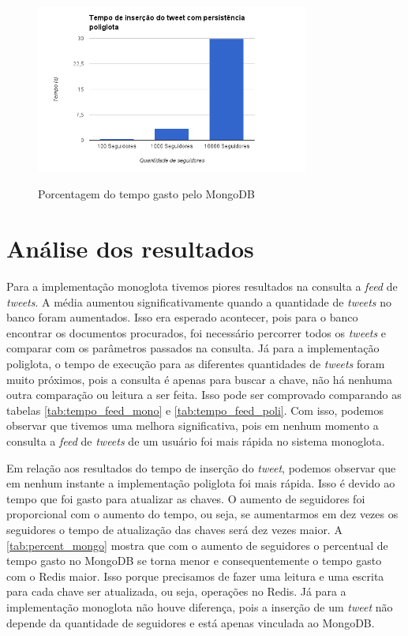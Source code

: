 \begin{figure}[H]
    \centering
    \caption{Porcentagem do tempo gasto pelo MongoDB}
    \includegraphics[width=0.8\textwidth]{./04-figuras/percent_mongo.png}
    \label{fig:percent_mongo}
\end{figure}



\section{Análise dos resultados}
\label{sec:resultEval}

Para a implementação monoglota tivemos piores resultados na consulta a \textit{feed} de \textit{tweets}. A média aumentou significativamente quando a quantidade de \textit{tweets} no banco foram aumentados. Isso era esperado acontecer, pois para o banco encontrar os documentos procurados, foi necessário percorrer todos os \textit{tweets} e comparar com os parâmetros passados na consulta.
Já para a implementação poliglota, o tempo de execução para as diferentes quantidades de \textit{tweets} foram muito próximos, pois a consulta é apenas para buscar a chave, não há nenhuma outra comparação ou leitura a ser feita. Isso pode ser comprovado comparando as tabelas \ref{tab:tempo_feed_mono} e \ref{tab:tempo_feed_poli}.
Com isso, podemos observar que tivemos uma melhora significativa, pois em nenhum momento a consulta a \textit{feed} de \textit{tweets} de um usuário foi mais rápida no sistema monoglota.

Em relação aos resultados do tempo de inserção do \textit{tweet}, podemos observar que em nenhum instante a implementação poliglota foi mais rápida. Isso é devido ao tempo que foi gasto para atualizar as chaves. O aumento de seguidores foi proporcional com o aumento do tempo, ou seja, se aumentarmos em dez vezes os seguidores o tempo de atualização das chaves será dez vezes maior. A \autoref{tab:percent_mongo} mostra que com o aumento de seguidores o percentual de tempo gasto no MongoDB se torna menor e consequentemente o tempo gasto com o \ac{Redis} maior.
Isso porque precisamos de fazer uma leitura e uma escrita para cada chave ser atualizada, ou seja, operações no \ac{Redis}. Já para a implementação monoglota não houve diferença, pois a inserção de um \textit{tweet} não depende da quantidade de seguidores e está apenas vinculada ao MongoDB.


